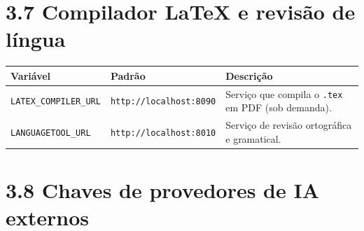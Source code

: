 \documentclass[
  brazilian,
  a4paper,12pt,oneside]{report}
\newcounter{none} %
\begin{document}
\section{3.7 Compilador LaTeX e revisão de
língua}\label{compilador-latex-e-revisuxe3o-de-luxedngua}

{\def\LTcaptype{none} %
\begin{longtable}[]{@{}
  >{\raggedright\arraybackslash}p{}
  >{\raggedright\arraybackslash}p{}
  >{\raggedright\arraybackslash}p{}@{}}
\toprule\noalign{}
\begin{minipage}[b]{\linewidth}\raggedright
Variável
\end{minipage} & \begin{minipage}[b]{\linewidth}\raggedright
Padrão
\end{minipage} & \begin{minipage}[b]{\linewidth}\raggedright
Descrição
\end{minipage} \\
\midrule\noalign{}
\endhead
\bottomrule\noalign{}
\endlastfoot
\texttt{LATEX\_}\allowbreak{}\texttt{COMPILER\_}\allowbreak{}\texttt{URL}
&
\texttt{http:}\allowbreak{}\texttt{/}\allowbreak{}\texttt{/}\allowbreak{}\texttt{localhost:}\allowbreak{}\texttt{8090}
& Serviço que compila o \texttt{.}\allowbreak{}\texttt{tex} em PDF (sob
demanda). \\
\texttt{LANGUAGETOOL\_}\allowbreak{}\texttt{URL} &
\texttt{http:}\allowbreak{}\texttt{/}\allowbreak{}\texttt{/}\allowbreak{}\texttt{localhost:}\allowbreak{}\texttt{8010}
& Serviço de revisão ortográfica e gramatical. \\
\end{longtable}
}

\section{3.8 Chaves de provedores de IA
externos}\label{chaves-de-provedores-de-ia-externos}
\end{document}
